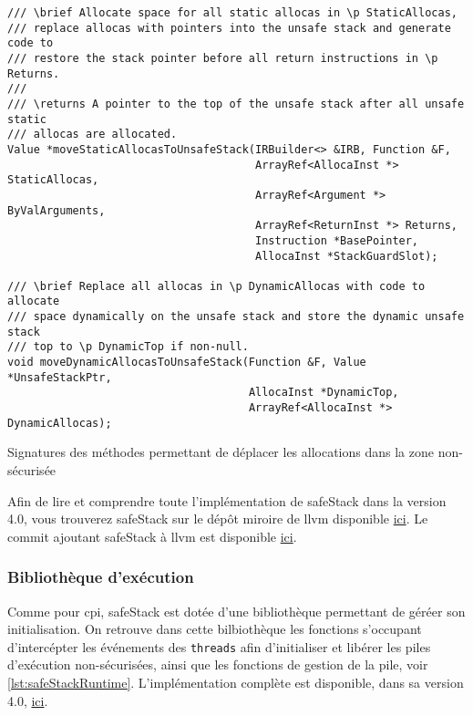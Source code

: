 \begin{listing}
	\begin{verbatim}
/// \brief Allocate space for all static allocas in \p StaticAllocas,
/// replace allocas with pointers into the unsafe stack and generate code to
/// restore the stack pointer before all return instructions in \p Returns.
///
/// \returns A pointer to the top of the unsafe stack after all unsafe static
/// allocas are allocated.
Value *moveStaticAllocasToUnsafeStack(IRBuilder<> &IRB, Function &F,
                                      ArrayRef<AllocaInst *> StaticAllocas,
                                      ArrayRef<Argument *> ByValArguments,
                                      ArrayRef<ReturnInst *> Returns,
                                      Instruction *BasePointer,
                                      AllocaInst *StackGuardSlot);

/// \brief Replace all allocas in \p DynamicAllocas with code to allocate
/// space dynamically on the unsafe stack and store the dynamic unsafe stack
/// top to \p DynamicTop if non-null.
void moveDynamicAllocasToUnsafeStack(Function &F, Value *UnsafeStackPtr,
                                     AllocaInst *DynamicTop,
                                     ArrayRef<AllocaInst *> DynamicAllocas);
	\end{verbatim}
	\caption{Signatures des méthodes permettant de déplacer les allocations dans la zone non-sécurisée}
	\label{lst:moveAllocasToUnsafeStack}
\end{listing}

Afin de lire et comprendre toute l'implémentation de \og \gls{safeStack} \fg dans la version 4.0, vous trouverez \og \gls{safeStack} \fg sur le dépôt miroire de \gls{llvm} disponible \href{https://github.com/llvm-mirror/llvm/blob/release_40/lib/CodeGen/SafeStack.cpp}{ici}. Le commit ajoutant \og \gls{safeStack} \fg à \gls{llvm} est disponible \href{https://github.com/llvm-mirror/llvm/commit/7ffec838a2b72e6841d9fb993b5fe6a45f3b2a90#diff-0ae4221c82094c2703f2511b921530e0}{ici}.

\subsubsection{Bibliothèque d'exécution}


Comme pour \gls{cpi}, \og \gls{safeStack} \fg est dotée d'une bibliothèque permettant de géréer son initialisation. On retrouve dans cette bilbiothèque les fonctions s'occupant d'intercépter les événements des \texttt{threads} afin d'initialiser et libérer les piles d'exécution non-sécurisées, ainsi que les fonctions de gestion de la pile, voir \autoref{lst:safeStackRuntime}. L'implémentation complète est disponible, dans sa version 4.0, \href{https://github.com/llvm-mirror/compiler-rt/blob/release_40/lib/safestack/safestack.cc}{ici}.



